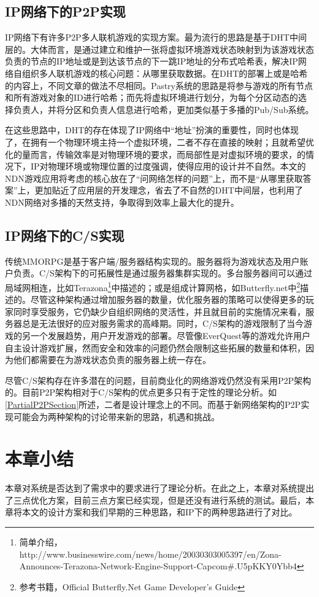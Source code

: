\subsection*{IP网络下的P2P实现}
\par
IP网络下有许多P2P多人联机游戏的实现方案。最为流行的思路是基于DHT中间层的。大体而言，是通过建立和维护一张将虚拟环境游戏状态映射到为该游戏状态负责的节点的IP地址或是到达该节点的下一跳IP地址的分布式哈希表，解决IP网络自组织多人联机游戏的核心问题：从哪里获取数据。在DHT的部署上或是哈希的内容上，不同文章的做法不尽相同。Pastry系统\cite{IPP2PMMORPG1}的思路是将参与游戏的所有节点和所有游戏对象的ID进行哈希；而先将虚拟环境进行划分，为每个分区动态的选择负责人，并将分区和负责人信息进行哈希，更加类似基于多播的Pub/Sub系统\cite{PubSubRef}。
\par
在这些思路中，DHT的存在体现了IP网络中“地址”扮演的重要性，同时也体现了，在拥有一个物理环境主持一个虚拟环境，二者不存在直接的映射；且就希望优化的量而言，传输效率是对物理环境的要求，而局部性是对虚拟环境的要求，的情况下，IP对物理环境或物理位置的过度强调，使得应用的设计并不自然。本文的NDN游戏应用将考虑的核心放在了“问网络怎样的问题”上，而不是“从哪里获取答案”上，更加贴近了应用层的开发理念，省去了不自然的DHT中间层，也利用了NDN网络对多播的天然支持，争取得到效率上最大化的提升。
\subsection*{IP网络下的C/S实现}
\par
传统MMORPG是基于客户端/服务器结构实现的。服务器将为游戏状态及用户账户负责。C/S架构下的可拓展性是通过服务器集群实现的。多台服务器间可以通过局域网相连，比如Terazona\footnote{简单介绍，http://www.businesswire.com/news/home/20030303005397/en/Zona-Announces-Terazona-Network-Engine-Support-Capcom\#.U5pKKY0Ybb4}中描述的；或是组成计算网格，如Butterfly.net中\footnote{参考书籍，Official Butterfly.Net Game Developer's Guide}描述的。尽管这种架构通过增加服务器的数量，优化服务器的策略可以使得更多的玩家同时享受服务，它仍缺少自组织网络的灵活性，并且就目前的实施情况来看，服务器总是无法很好的应对服务需求的高峰期。同时，C/S架构的游戏限制了当今游戏的另一个发展趋势，用户开发游戏的部署。尽管像EverQuest等的游戏允许用户自主设计游戏扩展，然而安全和效率的问题仍然会限制这些拓展的数量和体积，因为他们都需要在为游戏状态负责的服务器上统一存在。
\par
尽管C/S架构存在许多潜在的问题，目前商业化的网络游戏仍然没有采用P2P架构的。目前P2P架构相对于C/S架构的优点更多只有于定性的理论分析。如\ref{PartialP2PSection}所述，二者是设计理念上的不同。而基于新网络架构的P2P实现可能会为两种架构的讨论带来新的思路，机遇和挑战。
\section{本章小结}
本章对系统是否达到了需求中的要求进行了理论分析。在此之上，本章对系统提出了三点优化方案，目前三点方案已经实现，但是还没有进行系统的测试。最后，本章将本文的设计方案和我们早期的三种思路，和IP下的两种思路进行了对比。
